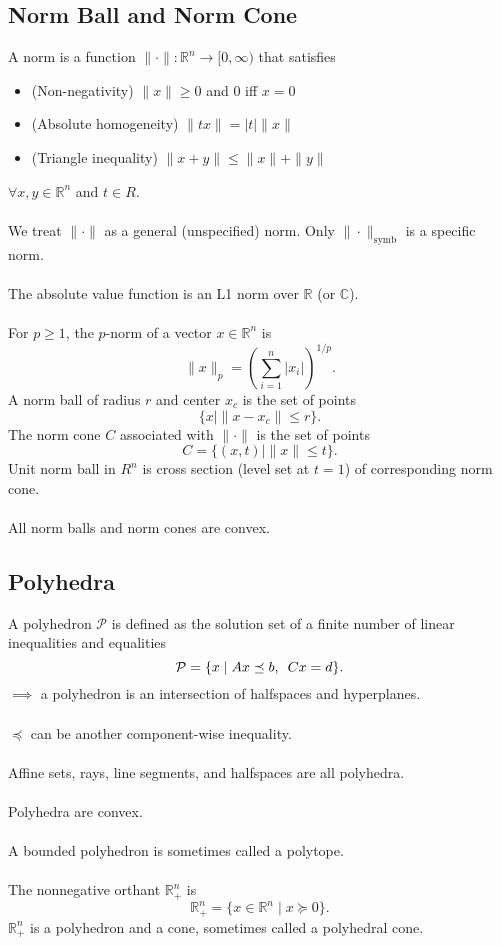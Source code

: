 \documentclass[]{article}
\begin{document}
\subsection*{Norm Ball and Norm Cone}
A norm is a function $ \| \cdot \| : \mathbb{R}^{n}
\rightarrow [0,\infty)$ that satisfies
\begin{itemize}
	\item (Non-negativity) $\| x \| \geq 0$ and $0$ iff $x=0$
	\item (Absolute homogeneity) $\| tx \| = |t|\|x\|$
	\item (Triangle inequality) $\|x+y\| \leq \|x\| + \|y\|$ 
\end{itemize}
$\forall x,y \in \mathbb{R}^{n}$ and $t \in R$. \\\\
We treat $\|\cdot\|$ as a general (unspecified) norm. Only $\|\cdot\|_{\text{symb}}$ is a specific norm. \\\\
The absolute value function is an L1 norm over $\mathbb{R}$ (or $\mathbb{C}$). \\\\
For $p \geq 1 $, the $p$-norm of a vector $x \in \mathbb{R}^n$ is $$\|x\|_{p} = \left(\sum_{i=1}^{n} |x_{i}|\right)^{1/p}.$$
A norm ball of radius $r$ and center $x_{c}$ is the set of points $$\{x \mid \|x-x_{c}\| \leq r \}.$$
The norm cone $C$ associated with $\|\cdot\|$ is the set of points $$C=\{(x,t) \mid \|x\| \leq t \}.$$
Unit norm ball in $R^{n}$ is cross section (level set at $t=1$) of corresponding norm cone. \\\\ 
All norm balls and norm cones are convex. \\

\subsection*{Polyhedra}
A polyhedron $\mathcal{P}$ is defined as the solution set of a finite number of linear inequalities and equalities $$\mathcal{P} = \{x \mid Ax \preceq b, \enskip Cx = d\}.$$
$\implies$ a polyhedron is an intersection of halfspaces and hyperplanes. \\\\
$\preceq$ can be another component-wise inequality. \\\\
Affine sets, rays, line segments, and halfspaces are all polyhedra. \\\\
Polyhedra are convex. \\\\
A bounded polyhedron is sometimes called a polytope. \\\\
The nonnegative orthant $\mathbb{R}^{n}_{+}$ is $$\mathbb{R}^{n}_{+} = \{x \in \mathbb{R}^{n} \mid x \succeq 0\}.$$
$\mathbb{R}^{n}_{+}$ is a polyhedron and a cone, sometimes called a polyhedral cone. \\
\end{document}
